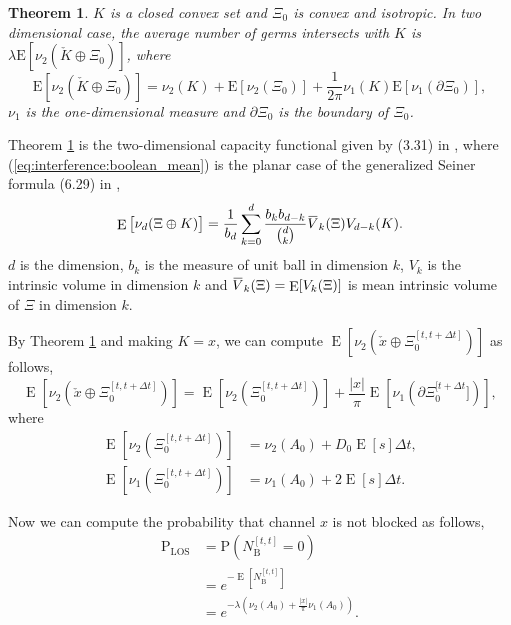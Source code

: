 \documentclass[10pt, conference, letterpaper]{IEEEtran}
\newtheorem{theorem}{Theorem}
\DeclareMathOperator*{\E}{\mathrm{E}}
\newcommand{\overbar}[1]{\mkern 1.5mu\overline{\mkern-1.5mu#1\mkern-1.5mu}\mkern 1.5mu}
\begin{document}
\begin{theorem}\label{theorem:boolean_mean}
$K$ is a closed convex set and $\Xi_0$ is convex and isotropic. In two dimensional case, the average number of germs intersects  with $K$ is $\lambda\mathrm{E}[\nu_2(\check{K}\oplus \Xi_0)]$, where 
\begin{equation}\label{eq:interference:boolean_mean}
\mathrm{E}[\nu_2(\check{K}\oplus \Xi_0)] = \nu_2(K) + \mathrm{E}[\nu_2(\Xi_0)] + \frac{1}{2\pi}\nu_1(K)\mathrm{E}[\nu_1(\partial \Xi_0)],
\end{equation}
$\nu_1$ is the one-dimensional measure and $\partial \Xi_0$ is the boundary of $\Xi_0$.
\end{theorem}
Theorem \ref{theorem:boolean_mean} is the two-dimensional capacity functional given by (3.31) in \cite{stochasticapp}, where (\ref{eq:interference:boolean_mean}) is the planar case of the generalized Seiner formula (6.29) in \cite{stochasticapp},  
\begin{equation*}
\E\big[\nu_d(\Xi\oplus K)\big] = \frac{1}{b_d}\sum\limits_{k=0}^{d}\frac{b_k b_{d-k}}{{d \choose k}}\overbar{V}_k(\Xi) V_{d-k}(K).
\end{equation*}
$d$ is the dimension, $b_k$ is the measure of unit ball in dimension $k$, $V_k$ is the intrinsic volume in dimension $k$ and $\overbar{V}_k(\Xi) = \E[V_k(\Xi)]$ is mean intrinsic volume of $\Xi$ in dimension $k$. 

By Theorem \ref{theorem:boolean_mean} and making $K = x$, we can compute $\E[\nu_2(\check{x}\oplus\Xi_0^{[t, t+\Delta t]})]$ as follows,
\begin{equation}\label{eq:boolean_mean}
\E[\nu_2(\check{x}\oplus\Xi_0^{[t, t+\Delta t]})] = \E[\nu_2(\Xi_0^{[t, t+\Delta t]})] + \frac{|x|}{\pi}\E[\nu_1(\partial \Xi_0^{[t + \Delta t}])],
\end{equation}
where
\begin{equation*}
\begin{split}
\E[\nu_2(\Xi_0^{[t, t+\Delta t]})] & = \nu_2(A_0) + D_0\E[s]\Delta t,\\
\E[\nu_1(\Xi_0^{[t, t+\Delta t]})] & = \nu_1(A_0) + 2\E[s]\Delta t.
\end{split}
\end{equation*}

Now we can compute the probability that channel $x$ is not blocked as follows, 
\begin{equation}\label{eq:P_LOS}
\begin{aligned}
\mathrm{P}_{\mathrm{LOS}} & = \mathrm{P}(N_{\mathrm{B}}^{[t, t]}=0)  \\
& = e^{-\E[N_\mathrm{B}^{[t,t]}]} \\
& = e^{-\lambda(\nu_2(A_0) + \frac{|x|}{\pi}\nu_1(A_0))}. 
\end{aligned}
\end{equation}
\end{document}
